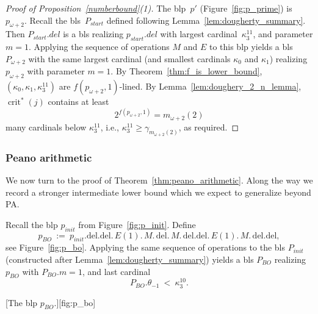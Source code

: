 \documentclass{article}
\theoremstyle{definition}
\theoremstyle{remark}
\DeclareMathOperator{\crit}{crit}
\begin{document}
\begin{proof}[Proof of Proposition~\ref{numberbound}(1)]
  The blp~$p'$ (Figure~\ref{fig:p_prime}) is $p_{\omega+2}$. Recall the bls~$P_{start}$ defined following Lemma~\ref{lem:dougherty_summary}. Then $P_{start}.del$ is a bls realizing $p_{start}.del$ with largest cardinal~$\kappa_3^{11}$, and parameter $m=1$. Applying the sequence of operations $M$ and $E$ to this blp yields a bls $P_{\omega+2}$ with the same largest cardinal (and smallest cardinals $\kappa_0$ and $\kappa_1$) realizing $p_{\omega+2}$ with parameter $m=1$. By Theorem~\ref{thm:f_is_lower_bound}, $(\kappa_0,\kappa_1,\kappa_3^{11})$ are $f(p_{\omega+2},1)$-lined. By Lemma~\ref{lem:doughery_2_n_lemma}, $\crit^*(j)$ contains at least 
  \[
    2^{f(p_{\omega+2},1)} = m_{\omega+2}(2)
  \]
  many cardinals below $\kappa_3^{11}$, i.e., $\kappa_3^{11}\ge \gamma_{m_{\omega+2}(2)}$, as required. 
\end{proof}






\subsubsection*{Peano arithmetic}
\label{subsec:PA}

We now turn to the proof of Theorem~\ref{thm:peano_arithmetic}. Along the way we record a stronger intermediate lower bound which we expect to generalize beyond PA.

Recall the blp $p_{init}$ from Figure~\ref{fig:p_init}. Define
\[
p_{BO}\ :=\ p_{init}.{\mathrm{del}}.{\mathrm{del}}.\,E(1).\,M.\,{\mathrm{del}}.\,M.\,{\mathrm{del}}.{\mathrm{del}}.\,E(1).\,M.\,{\mathrm{del}}.{\mathrm{del}},
\]
see Figure~\ref{fig:p_bo}. Applying the same sequence of operations to the bls $P_{init}$ (constructed after Lemma~\ref{lem:dougherty_summary}) yields a bls $P_{BO}$ realizing $p_{BO}$ with  $P_{BO}.m=1$, and last cardinal
\[
P_{BO}.\theta_{-1}\ <\ \kappa_3^{10}.
\]


[The blp $p_{BO}$.][fig:p_bo]
\end{document}
